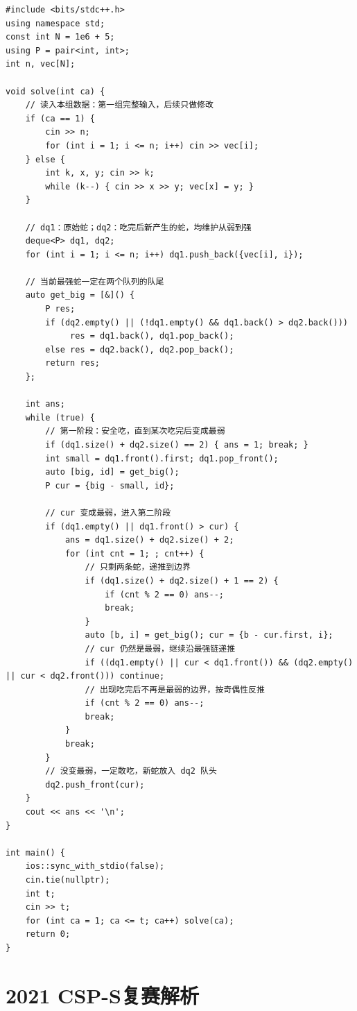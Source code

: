 \documentclass{book}
\begin{document}
    \begin{lstlisting}[style = code]
#include <bits/stdc++.h>
using namespace std;
const int N = 1e6 + 5;
using P = pair<int, int>;
int n, vec[N];

void solve(int ca) {
    // 读入本组数据：第一组完整输入，后续只做修改
    if (ca == 1) {
        cin >> n;
        for (int i = 1; i <= n; i++) cin >> vec[i];
    } else {
        int k, x, y; cin >> k;
        while (k--) { cin >> x >> y; vec[x] = y; }
    }

    // dq1：原始蛇；dq2：吃完后新产生的蛇，均维护从弱到强
    deque<P> dq1, dq2;
    for (int i = 1; i <= n; i++) dq1.push_back({vec[i], i});

    // 当前最强蛇一定在两个队列的队尾
    auto get_big = [&]() {
        P res;
        if (dq2.empty() || (!dq1.empty() && dq1.back() > dq2.back()))
             res = dq1.back(), dq1.pop_back();
        else res = dq2.back(), dq2.pop_back();
        return res;
    };

    int ans;
    while (true) {
        // 第一阶段：安全吃，直到某次吃完后变成最弱
        if (dq1.size() + dq2.size() == 2) { ans = 1; break; }
        int small = dq1.front().first; dq1.pop_front();
        auto [big, id] = get_big();
        P cur = {big - small, id};

        // cur 变成最弱，进入第二阶段
        if (dq1.empty() || dq1.front() > cur) {
            ans = dq1.size() + dq2.size() + 2;
            for (int cnt = 1; ; cnt++) {
                // 只剩两条蛇，递推到边界
                if (dq1.size() + dq2.size() + 1 == 2) {
                    if (cnt % 2 == 0) ans--;
                    break;
                }
                auto [b, i] = get_big(); cur = {b - cur.first, i};
                // cur 仍然是最弱，继续沿最强链递推
                if ((dq1.empty() || cur < dq1.front()) && (dq2.empty() || cur < dq2.front())) continue;
                // 出现吃完后不再是最弱的边界，按奇偶性反推
                if (cnt % 2 == 0) ans--;
                break;
            }
            break;
        }
        // 没变最弱，一定敢吃，新蛇放入 dq2 队头
        dq2.push_front(cur);
    }
    cout << ans << '\n';
}

int main() {
    ios::sync_with_stdio(false); 
    cin.tie(nullptr);
    int t; 
    cin >> t;
    for (int ca = 1; ca <= t; ca++) solve(ca);
    return 0;
}
\end{lstlisting}
\chapter{2021 CSP-S复赛解析}
\newpage
\end{document}
